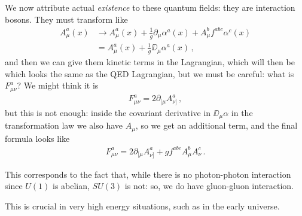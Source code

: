 \documentclass[main.tex]{subfiles}
\begin{document}
We now attribute actual \emph{existence} to these quantum fields: they are interaction bosons. 
They must transform like 
%
\begin{align}
A^{a}_{\mu }(x) &\to  A^{a}_{\mu } (x) + \frac{1}{g} \partial_{\mu } \alpha^{a} (x) + A^{b}_{\mu } f^{abc} \alpha^{c} (x) 
 \\
&=  A^{a}_{\mu } (x) + \frac{1}{g} \DD_{\mu } \alpha^{a}(x)
\,,
\end{align}
%
and then we can give them kinetic terms in the Lagrangian, which will then be 
%
%
which looks the same as the QED Lagrangian, but we must be careful: what is \(F_{\mu \nu }^{a}\)? We might think it is 
%
\begin{align}
F^{a}_{\mu \nu } = 2 \partial_{[\mu } A^{a}_{\nu ]}
\,,
\end{align}
%
but this is not enough: inside the covariant derivative in \(\DD_{\mu } \alpha \) in the transformation law we also have \(A_{\mu }\), so we get an additional term, and the final formula looks like 
%
\begin{align}
F^{a}_{\mu \nu } = 2 \partial_{[\mu } A^{a}_{\nu ]} + g f^{abc} A^{b}_{\mu } A^{c}_{\nu }
\,.
\end{align}

This corresponds to the fact that, while there is no photon-photon interaction since \(U(1)\) is abelian,  \(SU(3)\) is not: so, we do have gluon-gluon interaction. 

This is crucial in very high energy situations, such as in the early universe. 
\end{document}
